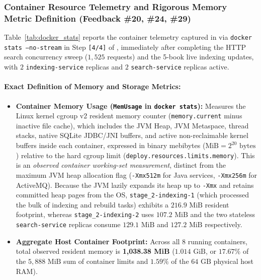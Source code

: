 \documentclass[10pt,a4paper]{article}
\begin{document}
\subsubsection{Container Resource Telemetry and Rigorous Memory Metric Definition (Feedback \#20, \#24, \#29)}
Table~\ref{tab:docker_stats} reports the container telemetry captured in  via \texttt{docker stats --no-stream} in Step \texttt{[4/4]} of , immediately after completing the HTTP search concurrency sweep ($1,525$ requests) and the 5-book live indexing updates, with $2$ \texttt{indexing-service} replicas and $2$ \texttt{search-service} replicas active.

\paragraph{Exact Definition of Memory and Storage Metrics:}
\begin{itemize}[leftmargin=*,nosep]
    \item \textbf{Container Memory Usage (\texttt{MemUsage} in \texttt{docker stats}):} Measures the Linux kernel cgroup v2 resident memory counter (\texttt{memory.current} minus inactive file cache), which includes the JVM Heap, JVM Metaspace, thread stacks, native SQLite JDBC/JNI buffers, and active non-reclaimable kernel buffers inside each container, expressed in binary mebibytes ($\text{MiB} = 2^{20}\text{ bytes}$) relative to the hard cgroup limit (\texttt{deploy.resources.limits.memory}). This is an \emph{observed container working-set measurement}, distinct from the maximum JVM heap allocation flag (\texttt{-Xmx512m} for Java services, \texttt{-Xmx256m} for ActiveMQ). Because the JVM lazily expands its heap up to \texttt{-Xmx} and retains committed heap pages from the OS, \texttt{stage\_2-indexing-1} (which processed the bulk of indexing and rebuild tasks) exhibits a $216.9\text{ MiB}$ resident footprint, whereas \texttt{stage\_2-indexing-2} uses $107.2\text{ MiB}$ and the two stateless \texttt{search-service} replicas consume $129.1\text{ MiB}$ and $127.2\text{ MiB}$ respectively.
    \item \textbf{Aggregate Host Container Footprint:} Across all 8 running containers, total observed resident memory is \textbf{1,038.38 MiB} ($1.014\text{ GiB}$, or $17.67\%$ of the $5,888\text{ MiB}$ sum of container limits and $1.59\%$ of the $64\text{ GB}$ physical host RAM).
\end{itemize}
\end{document}
